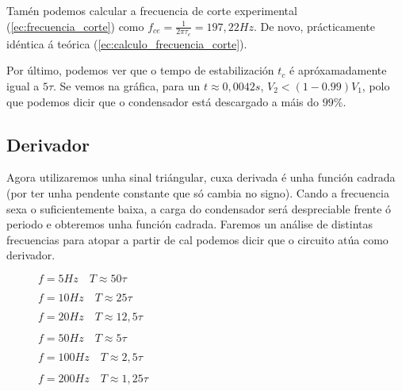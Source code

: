 \documentclass[12pt, a4paper, titlepage]{article}
\begin{document}
    Tamén podemos calcular a frecuencia de corte experimental (\ref{ec:frecuencia_corte}) como $f_{ce} = \frac{1}{2 \pi \tau_e} = 197,22 Hz$. De novo, prácticamente idéntica á teórica (\ref{ec:calculo_frecuencia_corte}).

    Por último, podemos ver que o tempo de estabilización $t_c$ é apróxamadamente igual a $5\tau$. Se vemos na gráfica, para un $t \approx 0,0042 s$, $V_2 < (1 - 0.99) V_1$, polo que podemos dicir que o condensador está descargado a máis do $99\%$.

    \begin{figure}[H]
      \hspace{2.7cm}
      \resizebox{16cm}{!}{}
    \end{figure}

    \subsection{Derivador}

    Agora utilizaremos unha sinal triángular, cuxa derivada é unha función cadrada (por ter unha pendente constante que só cambia no signo).
    Cando a frecuencia sexa o suficientemente baixa, a carga do condensador será despreciable frente ó periodo e obteremos unha función cadrada.
    Faremos un análise de distintas frecuencias para atopar a partir de cal podemos dicir que o circuito atúa como derivador.

    \begin{figure}[H]
      \centering
      \begin{minipage}{5.2cm}
        $f = 5Hz \quad T \approx 50 \tau$

        \resizebox{5.2cm}{!}{}

        $f = 10Hz \quad T \approx 25 \tau$

        \resizebox{8.1cm}{!}{}
      \end{minipage}
      \begin{minipage}{5.2cm}
        $f = 20Hz \quad T \approx 12,5 \tau$

        \resizebox{8.4cm}{!}{}

        $f = 50Hz \quad T \approx 5 \tau$

        \resizebox{19.7cm}{!}{}
      \end{minipage}
      \begin{minipage}{5.2cm}
        $f = 100Hz \quad T \approx 2,5 \tau$

        \resizebox{5.2cm}{!}{}

        $f = 200Hz \quad T \approx 1,25 \tau$

        \resizebox{8.1cm}{!}{}
      \end{minipage}
    \end{figure}
\end{document}
